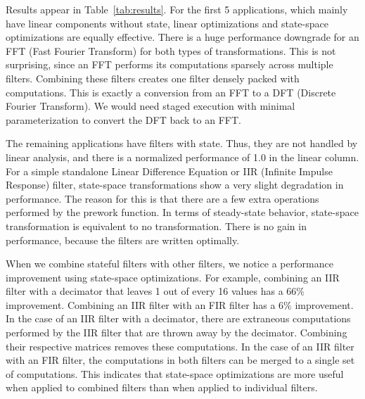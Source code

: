 Results appear in Table~\ref{tab:results}.  For the first 5
applications, which mainly have linear components without state,
linear optimizations and state-space optimizations are equally
effective. There is a huge performance downgrade for an FFT (Fast
Fourier Transform) for both types of transformations. This is not
surprising, since an FFT performs its computations sparsely across
multiple filters. Combining these filters creates one filter densely
packed with computations. This is exactly a conversion from an FFT to
a DFT (Discrete Fourier Transform).  We would need staged execution
with minimal parameterization to convert the DFT back to an FFT.

The remaining applications have filters with state.  Thus, they are
not handled by linear analysis, and there is a normalized performance
of 1.0 in the linear column.  For a simple standalone Linear
Difference Equation or IIR (Infinite Impulse Response) filter,
state-space transformations show a very slight degradation in
performance. The reason for this is that there are a few extra
operations performed by the prework function. In terms of steady-state
behavior, state-space transformation is equivalent to no
transformation. There is no gain in performance, because the filters
are written optimally.

When we combine stateful filters with other filters, we notice a
performance improvement using state-space optimizations. For example,
combining an IIR filter with a decimator that leaves 1 out of every 16
values has a 66\% improvement. Combining an IIR filter with an FIR
filter has a 6\% improvement. In the case of an IIR filter with a
decimator, there are extraneous computations performed by the IIR
filter that are thrown away by the decimator.  Combining their
respective matrices removes these computations. In the case of an IIR
filter with an FIR filter, the computations in both filters can be
merged to a single set of computations. This indicates that
state-space optimizations are more useful when applied to combined
filters than when applied to individual filters.
